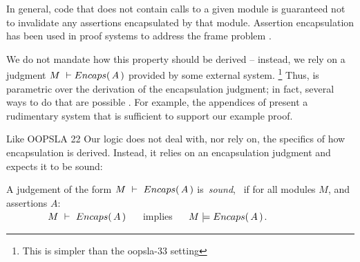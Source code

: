 {In general},  code that does not contain 
calls to a {given} module is guaranteed not to invalidate any assertions encapsulated by that module.
 Assertion encapsulation has been used in proof systems to {address}   the  {frame} problem
 \cite{objInvars,encaps}. 

We  do not mandate how this property should be derived -- instead, we rely on a judgment 
$M\ \vdash  \encaps{A}$ provided by some external system. \footnote{This is simpler than the oopsla-33 setting}
Thus, \SpecLang is parametric over the derivation of the encapsulation
     judgment; in fact, several ways to do that are possible \cite{TAME2003,ownEncaps,objInvars}. For example,
 the appendices of
    \cite{necessityFull} present a 
    rudimentary system that is sufficient to support our example
    proof.  



Like OOPSLA 22 Our logic does not {deal with, nor} rely on, the specifics of  how   encapsulation
{is derived}.
{Instead, it relies} on an encapsulation judgment and expects it to be sound:

\begin{definition}
\label{lem:encap-soundness}
A judgement of the form $M\ \vdash\ {Encaps(\, A\, )}$  is\  \emph{sound}, \ if 
for all modules $M$, and assertions $A$:\\

$\strut \hspace{1.5cm} M\ \vdash\ {Encaps(\, A\, )} \ \ \ \ $ implies $\ \ \ \ \satisfies{M}{\encaps{A}}$.
\end{definition}




